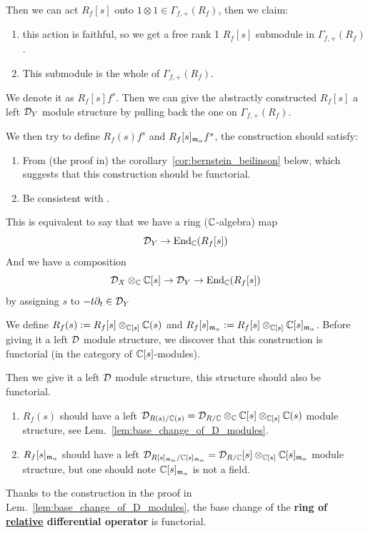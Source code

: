 \begin{remark}
    \medskip

    Then we can act $R_f[s]$ onto $1\otimes 1 \in \Gamma_{f,+}(R_f)$, then we claim:
    \begin{enumerate}
        \item this action is faithful, so we get a free rank 1 $R_f[s]$ submodule in $\Gamma_{f,+}(R_f)$.
        \item This submodule is the whole of $\Gamma_{f,+}(R_f)$.
    \end{enumerate}
    We denote it as $R_f[s]f^s$.
    Then we can give the abstractly constructed $R_f[s]$ a left $\mathcal{D}_Y$ module structure by pulling back the one on $\Gamma_{f,+}(R_f)$.
\end{remark}

\bigskip

\begin{remark}\label{rmk:base_change_of_R_f[s]_f^s}
    We then try to define $R_f(s)f^s$ and $R_f[s]_{\frak{m}_\alpha}f^s$, the construction should satisfy:
    \begin{enumerate}
        \item From (the proof in) the corollary~\ref{cor:bernstein_beilinson} below, which suggests that this construction should be functorial.
        \item Be consistent with \cite[The $\D_{U_s}$ module $\mathcal{M}$ defined in Proof of Theorem 2.2.1.]{PopaDMBG2021}.
    \end{enumerate}

    This is equivalent to say that we have a ring ($\mathbb{C}$-algebra) map
    \[
        \mathcal{D}_Y \to \operatorname{End}_{\mathbb{C}}(R_f[s])
    \]
    And we have a composition
    \[
        \mathcal{D}_X\otimes_{\mathbb{C}} \mathbb{C}[s] \to \mathcal{D}_Y \to \operatorname{End}_{\mathbb{C}}(R_f[s])
    \]
    by assigning $s$ to $-t\partial_t\in\mathcal{D}_Y$

    \medskip

    We define $R_f(s) := R_f[s]\otimes_{\mathbb{C}[s]}\mathbb{C}(s)$ and $R_f[s]_{\frak{m}_\alpha} := R_f[s]\otimes_{\mathbb{C}[s]}\mathbb{C}[s]_{\frak{m}_\alpha}$.
    Before giving it a left $\mathcal{D}$ module structure, we discover that this construction is functorial (in the category of $\mathbb{C}[s]$-modules).

    \medskip

    Then we give it a left $\mathcal{D}$ module structure, this structure should also be functorial.
    \begin{enumerate}
        \item $R_f(s)$ should have a left $\mathcal{D}_{R(s)/\mathbb{C}(s)} = \mathcal{D}_{R/\mathbb{C}}\otimes_{\mathbb{C}} \mathbb{C}[s]\otimes_{\mathbb{C}[s]}\mathbb{C}(s)$ module structure, see Lem.~\ref{lem:base_change_of_D_modules}.
        \item $R_f[s]_{\frak{m}_\alpha}$ should have a left $\mathcal{D}_{R[s]_{\frak{m}_\alpha}/\mathbb{C}[s]_{\frak{m}_\alpha}} = \mathcal{D}_{R/\mathbb{C}}[s]\otimes_{\mathbb{C}[s]} \mathbb{C}[s]_{\frak{m}_\alpha}$ module structure, but one should note $\mathbb{C}[s]_{\frak{m}_\alpha}$ is not a field.
    \end{enumerate}
    Thanks to the construction in the proof in Lem.~\ref{lem:base_change_of_D_modules}, the base change of the \textbf{ring of \underline{relative} differential operator} is functorial.


\end{remark}
